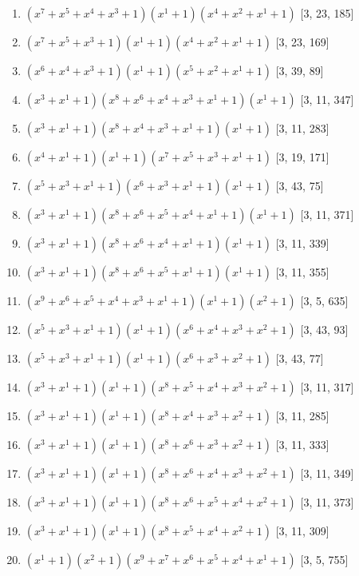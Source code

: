\documentclass[10pt,twocolumn]{article}
\begin{document}
\begin{enumerate}
\item $(x^{7} + x^{5} + x^{4} + x^{3} + 1)(x^{1} + 1)(x^{4} + x^{2} + x^{1} + 1)$  [3, 23, 185]
\item $(x^{7} + x^{5} + x^{3} + 1)(x^{1} + 1)(x^{4} + x^{2} + x^{1} + 1)$  [3, 23, 169]
\item $(x^{6} + x^{4} + x^{3} + 1)(x^{1} + 1)(x^{5} + x^{2} + x^{1} + 1)$  [3, 39, 89]
\item $(x^{3} + x^{1} + 1)(x^{8} + x^{6} + x^{4} + x^{3} + x^{1} + 1)(x^{1} + 1)$  [3, 11, 347]
\item $(x^{3} + x^{1} + 1)(x^{8} + x^{4} + x^{3} + x^{1} + 1)(x^{1} + 1)$  [3, 11, 283]
\item $(x^{4} + x^{1} + 1)(x^{1} + 1)(x^{7} + x^{5} + x^{3} + x^{1} + 1)$  [3, 19, 171]
\item $(x^{5} + x^{3} + x^{1} + 1)(x^{6} + x^{3} + x^{1} + 1)(x^{1} + 1)$  [3, 43, 75]
\item $(x^{3} + x^{1} + 1)(x^{8} + x^{6} + x^{5} + x^{4} + x^{1} + 1)(x^{1} + 1)$  [3, 11, 371]
\item $(x^{3} + x^{1} + 1)(x^{8} + x^{6} + x^{4} + x^{1} + 1)(x^{1} + 1)$  [3, 11, 339]
\item $(x^{3} + x^{1} + 1)(x^{8} + x^{6} + x^{5} + x^{1} + 1)(x^{1} + 1)$  [3, 11, 355]
\item $(x^{9} + x^{6} + x^{5} + x^{4} + x^{3} + x^{1} + 1)(x^{1} + 1)(x^{2} + 1)$  [3, 5, 635]
\item $(x^{5} + x^{3} + x^{1} + 1)(x^{1} + 1)(x^{6} + x^{4} + x^{3} + x^{2} + 1)$  [3, 43, 93]
\item $(x^{5} + x^{3} + x^{1} + 1)(x^{1} + 1)(x^{6} + x^{3} + x^{2} + 1)$  [3, 43, 77]
\item $(x^{3} + x^{1} + 1)(x^{1} + 1)(x^{8} + x^{5} + x^{4} + x^{3} + x^{2} + 1)$  [3, 11, 317]
\item $(x^{3} + x^{1} + 1)(x^{1} + 1)(x^{8} + x^{4} + x^{3} + x^{2} + 1)$  [3, 11, 285]
\item $(x^{3} + x^{1} + 1)(x^{1} + 1)(x^{8} + x^{6} + x^{3} + x^{2} + 1)$  [3, 11, 333]
\item $(x^{3} + x^{1} + 1)(x^{1} + 1)(x^{8} + x^{6} + x^{4} + x^{3} + x^{2} + 1)$  [3, 11, 349]
\item $(x^{3} + x^{1} + 1)(x^{1} + 1)(x^{8} + x^{6} + x^{5} + x^{4} + x^{2} + 1)$  [3, 11, 373]
\item $(x^{3} + x^{1} + 1)(x^{1} + 1)(x^{8} + x^{5} + x^{4} + x^{2} + 1)$  [3, 11, 309]
\item $(x^{1} + 1)(x^{2} + 1)(x^{9} + x^{7} + x^{6} + x^{5} + x^{4} + x^{1} + 1)$  [3, 5, 755]

\end{enumerate}
\end{document}

